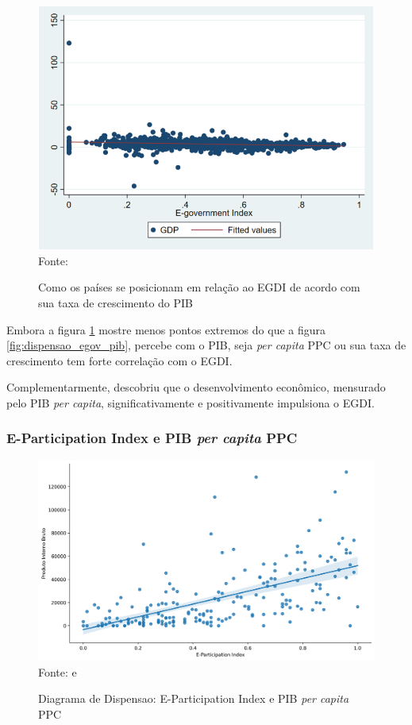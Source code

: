 \begin{figure}[H]
	\centering
	\caption{Como os países se posicionam em relação ao EGDI de acordo com sua taxa de crescimento do PIB}
	\includegraphics[width=1\linewidth]{figuras/egdi/usmanova_egdi_gdp}
	\label{fig:usmanova_egdi_gdp}
	\footnotesize{Fonte: \cite{alisherovna2021whether}}
\end{figure}

Embora a figura \ref{fig:usmanova_egdi_gdp} mostre menos pontos extremos do que a figura \ref{fig:dispensao_egov_pib}, percebe com o PIB, seja \textit{per capita} PPC ou sua taxa de crescimento tem forte correlação com o EGDI. 

Complementarmente, \cite{kumar2020cultural} descobriu que o desenvolvimento econômico, mensurado pelo PIB \textit{per capita}, significativamente e positivamente impulsiona o EGDI. 

\subsubsection{E-Participation Index e PIB \textit{per capita} PPC}

\begin{figure}[H]
	\centering
	\caption{Diagrama de Dispensao: E-Participation Index e PIB \textit{per capita} PPC}
	\includegraphics[width=1\linewidth]{figuras/egdi/dispensao_epart_pib}
	\label{fig:dispensao_epart_pib}
	\footnotesize{Fonte: \cite{ONU_EGDI_mapa} e \cite{WB_pib_per_capita_países}}
\end{figure}

